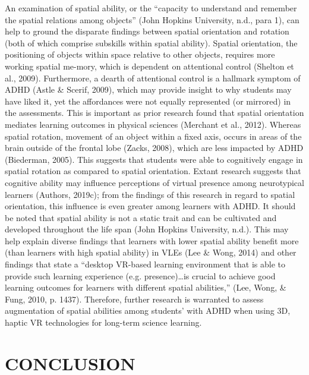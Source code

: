 \documentclass[11.5pt]{sig-alternate} %
\begin{document}
\begin{large}
An examination of spatial ability, or the “capacity to understand and remember the spatial relations among objects” (John Hopkins University, n.d., para 1), can help to ground the disparate findings between spatial orientation and rotation (both of which comprise subskills within spatial ability). Spatial orientation, the positioning of objects within space relative to other objects, requires more working spatial me-mory, which is dependent on attentional control (Shelton et al., 2009). Furthermore, a dearth of attentional control is a hallmark symptom of ADHD (Astle \& Scerif, 2009), which may provide insight to why students may have liked it, yet the affordances were not equally represented (or mirrored) in the assessments. This is important as prior research found that spatial orientation mediates learning outcomes in physical sciences (Merchant et al., 2012). Whereas spatial rotation, movement of an object within a fixed axis, occurs in areas of the brain outside of the frontal lobe (Zacks, 2008), which are less impacted by ADHD (Biederman, 2005). This suggests that students were able to cognitively engage in spatial rotation as compared to spatial orientation. Extant research suggests that cognitive ability may influence perceptions of virtual presence among neurotypical learners (Authors, 2019c); from the findings of this research in regard to spatial orientation, this influence is even greater among learners with ADHD. It should be noted that spatial ability is not a static trait and can be cultivated and developed throughout the life span (John Hopkins University, n.d.). This may help explain diverse findings that learners with lower spatial ability benefit more (than learners with high spatial ability) in VLEs (Lee \& Wong, 2014) and other findings that state a “desktop VR-based learning environment that is able to provide such learning experience (e.g. presence)…is crucial to achieve good learning outcomes for learners with different spatial abilities,” (Lee, Wong, \& Fung, 2010, p. 1437). Therefore, further research is warranted to assess augmentation of spatial abilities among students’ with ADHD when using 3D, haptic VR technologies for long-term science learning. 

\section*{CONCLUSION}


\end{large}
\end{document}

